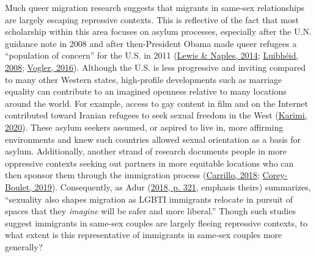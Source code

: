 \documentclass[
  12pt,
]{article}
\begin{document}
Much queer migration research suggests that migrants in same-sex relationships are largely escaping repressive contexts. This is reflective of the fact that most scholarship within this area focuses on asylum processes, especially after the U.N. guidance note in 2008 and after then-President Obama made queer refugees a ``population of concern'' for the U.S. in 2011 (\protect\hyperlink{ref-lewis_2014}{Lewis \& Naples, 2014}; \protect\hyperlink{ref-luibheid_2008}{Luibhéid, 2008}; \protect\hyperlink{ref-vogler_2016}{Vogler, 2016}). Although the U.S. is less progressive and inviting compared to many other Western states, high-profile developments such as marriage equality can contribute to an imagined openness relative to many locations around the world. For example, access to gay content in film and on the Internet contributed toward Iranian refugees to seek sexual freedom in the West (\protect\hyperlink{ref-karimi_2020}{Karimi, 2020}). These asylum seekers assumed, or aspired to live in, more affirming environments and knew such countries allowed sexual orientation as a basis for asylum. Additionally, another strand of research documents people in more oppressive contexts seeking out partners in more equitable locations who can then sponsor them through the immigration process (\protect\hyperlink{ref-carrillo_2018}{Carrillo, 2018}; \protect\hyperlink{ref-corey-boulet_2019}{Corey-Boulet, 2019}). Consequently, as Adur (\protect\hyperlink{ref-adur_2018}{2018, p. 321}, emphasis theirs) summarizes, ``sexuality also shapes migration as LGBTI immigrants relocate in pursuit of spaces that they \emph{imagine} will be safer and more liberal.'' Though such studies suggest immigrants in same-sex couples are largely fleeing repressive contexts, to what extent is this representative of immigrants in same-sex couples more generally?
\end{document}
